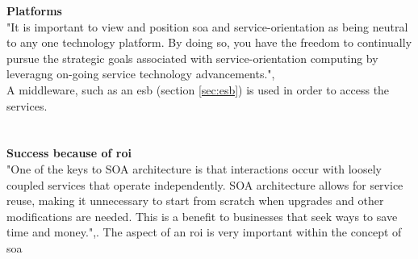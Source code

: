 \documentclass[12pt]{article}
\begin{document}
	\FloatBarrier
\noindent
\textbf{Platforms}\\
"It is important to view and position \gls{soa} and service-orientation as being neutral to any one technology platform. By doing so, you have the freedom to continually pursue the strategic goals associated with service-orientation computing by leveragng on-going service technology advancements.",\cite[page 29]{grau} \\ A middleware, such as an \gls{esb} (section \ref{sec:esb}) is used in order to access the services.\\
\\ \\
\textbf{Success because of \gls{roi}}\\
"One of the keys to SOA architecture is that interactions occur with loosely coupled services that operate independently. SOA architecture allows for service reuse, making it unnecessary to start from scratch when upgrades and other modifications are needed. This is a benefit to businesses that seek ways to save time and money.",\cite{searchsoa}. The aspect of an \gls{roi} is very important within the concept of \gls{soa}
\end{document}
